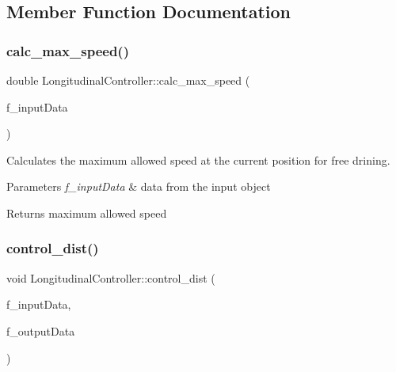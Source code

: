 \subsection{Member Function Documentation}
\mbox{\label{class_longitudinal_controller_af6e007f4b27571bd8ced67ab357bca4f}} 
\subsubsection{\texorpdfstring{calc\_max\_speed()}{calc\_max\_speed()}}
{\footnotesize\ttfamily double Longitudinal\+Controller\+::calc\+\_\+max\+\_\+speed (\begin{DoxyParamCaption}\item[{const \mbox{\hyperlink{struct_input_data}{Input\+Data}}}]{f\+\_\+input\+Data }\end{DoxyParamCaption})}



Calculates the maximum allowed speed at the current position for free drining. 


\begin{DoxyParams}{Parameters}
{\em f\+\_\+input\+Data} & data from the input object \\
\hline
\end{DoxyParams}
\begin{DoxyReturn}{Returns}
maximum allowed speed 
\end{DoxyReturn}
\mbox{\label{class_longitudinal_controller_a08d81a096be2e181a48ac84df253f065}} 
\subsubsection{\texorpdfstring{control\_dist()}{control\_dist()}}
{\footnotesize\ttfamily void Longitudinal\+Controller\+::control\+\_\+dist (\begin{DoxyParamCaption}\item[{const \mbox{\hyperlink{struct_input_data}{Input\+Data}}}]{f\+\_\+input\+Data,  }\item[{\mbox{\hyperlink{struct_output_data}{Output\+Data}} \&}]{f\+\_\+output\+Data }\end{DoxyParamCaption})}



